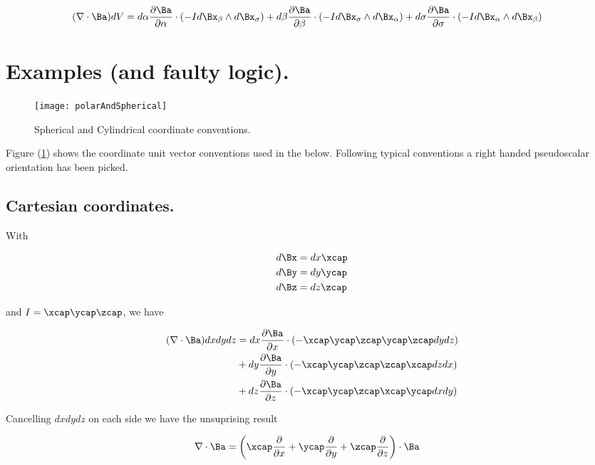 \begin{align}\label{eqn:divergenceForm}
(\grad \cdot \Ba ) dV &=
 d\alpha \PD{\alpha}{\Ba} \cdot (-I d\Bx_\beta \wedge d\Bx_\sigma)
+d\beta \PD{\beta}{\Ba} \cdot (-I d\Bx_\sigma \wedge d\Bx_\alpha)
+d\sigma \PD{\sigma}{\Ba} \cdot (-I d\Bx_\alpha \wedge d\Bx_\beta)
\end{align}

\section{Examples (and faulty logic).}

\begin{figure}[htp]
\centering
\texttt{[image: polarAndSpherical]}
\caption{Spherical and Cylindrical coordinate conventions.}\label{fig:polarAndSpherical}
\end{figure}

Figure (\ref{fig:polarAndSpherical}) shows the coordinate unit vector conventions used in the below.  Following typical conventions a right handed pseudoscalar orientation has been picked.

\subsection{Cartesian coordinates.}

With

\begin{align*}
d\Bx &= dx \xcap \\
d\By &= dy \ycap \\
d\Bz &= dz \zcap
\end{align*}

and $I = \xcap \ycap \zcap$, we have

\begin{align*}
(\grad \cdot \Ba ) dx dy dz &=
 dx \PD{x}{\Ba} \cdot (-\xcap \ycap \zcap \ycap \zcap dy dz )  \\
&+dy \PD{y}{\Ba} \cdot (-\xcap \ycap \zcap \zcap \xcap dz dx )  \\
&+dz \PD{z}{\Ba} \cdot (-\xcap \ycap \zcap \xcap \ycap dx dy )
\end{align*}

Cancelling $dx dy dz$ on each side we have the unsuprising result

\begin{align}\label{eqn:cartesianGradDot}
\grad \cdot \Ba &=
\left(\xcap \PD{x}{}
+\ycap \PD{y}{}
+\zcap \PD{z}{} \right) \cdot \Ba
\end{align}


